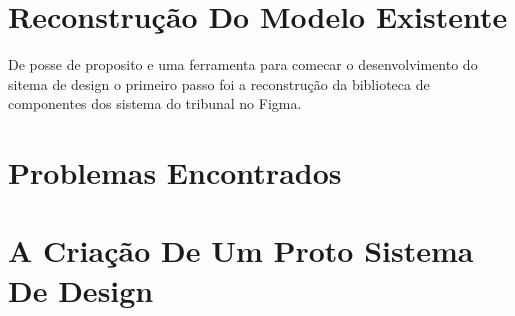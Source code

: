 \section{Reconstrução Do Modelo Existente} \label{secao31}

  De posse de proposito e uma ferramenta para comecar o desenvolvimento do sitema de design o primeiro passo foi a reconstrução da biblioteca de componentes dos sistema do tribunal no Figma.

\section{Problemas Encontrados} \label{secao32}

\section{A Criação De Um Proto Sistema De Design} \label{secao33}

\lipsum[1-1]